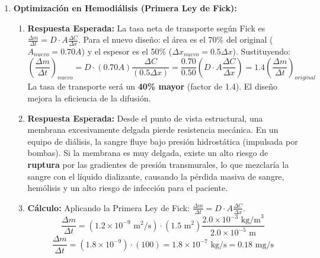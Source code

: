 \documentclass[11pt,letterpaper]{article}
\begin{document}
\begin{enumerate}[leftmargin=*]
    \item \textbf{Optimización en Hemodiálisis (Primera Ley de Fick):}
    \begin{enumerate}
        \item \textbf{Respuesta Esperada:} La tasa neta de transporte según Fick es $\frac{\Delta m}{\Delta t} = D \cdot A \frac{\Delta C}{\Delta x}$. 
        Para el nuevo diseño: el área es el 70\% del original ($A_{nuevo} = 0.70 A$) y el espesor es el 50\% ($\Delta x_{nuevo} = 0.5 \Delta x$).
        Sustituyendo:
        \[
        \left(\frac{\Delta m}{\Delta t}\right)_{nuevo} = D \cdot (0.70 A) \frac{\Delta C}{(0.5 \Delta x)} = \frac{0.70}{0.50} \left( D \cdot A \frac{\Delta C}{\Delta x} \right) = 1.4 \left(\frac{\Delta m}{\Delta t}\right)_{original}
        \]
        La tasa de transporte será un \textbf{40\% mayor} (factor de 1.4). El diseño mejora la eficiencia de la difusión.
        \item \textbf{Respuesta Esperada:} Desde el punto de vista estructural, una membrana excesivamente delgada pierde resistencia mecánica. En un equipo de diálisis, la sangre fluye bajo presión hidrostática (impulsada por bombas). Si la membrana es muy delgada, existe un alto riesgo de \textbf{ruptura} por las gradientes de presión transmurales, lo que mezclaría la sangre con el líquido dializante, causando la pérdida masiva de sangre, hemólisis y un alto riesgo de infección para el paciente.
        \item \textbf{Cálculo:} Aplicando la Primera Ley de Fick: $\frac{\Delta m}{\Delta t} = D \cdot A \frac{\Delta C}{\Delta x}$.
        \[ \frac{\Delta m}{\Delta t} = (1.2 \times 10^{-9} \text{ m}^2\text{/s}) \cdot (1.5 \text{ m}^2) \frac{2.0 \times 10^{-3} \text{ kg/m}^3}{2.0 \times 10^{-5} \text{ m}} \]
        \[ \frac{\Delta m}{\Delta t} = (1.8 \times 10^{-9}) \cdot (100) = 1.8 \times 10^{-7} \text{ kg/s} = 0.18 \text{ mg/s} \]
    \end{enumerate}

    \vspace{0.2cm}


\end{enumerate}
\end{document}
